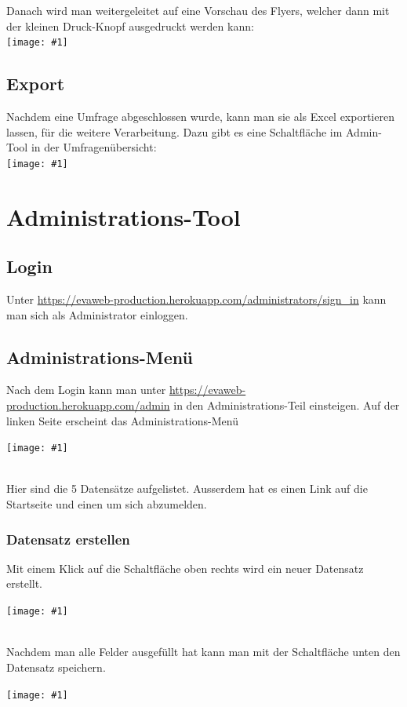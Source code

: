 \documentclass{article}
\newcommand{\inlineimage}[1]{
    \texttt{[image: \#1]}
}
\begin{document}
\begin{flushleft}
Danach wird man weitergeleitet auf eine Vorschau des Flyers, welcher dann mit der
kleinen Druck-Knopf ausgedruckt werden kann:
\\[0.25cm]
\inlineimage{images/flyer.png}
\end{flushleft}{}

\pagebreak
\subsection{Export}
Nachdem eine Umfrage abgeschlossen wurde, kann man sie als Excel exportieren lassen, für die weitere Verarbeitung.
Dazu gibt es eine Schaltfläche im Admin-Tool in der Umfragenübersicht:
\\[0.2cm]
\inlineimage{images/excel_export.png}

\pagebreak
\section{Administrations-Tool}
\subsection{Login}
Unter \underline{https://evaweb-production.herokuapp.com/administrators/sign\_in}
kann man sich als Administrator einloggen.

\subsection{Administrations-Menü}
Nach dem Login kann man unter \underline{https://evaweb-production.herokuapp.com/admin}
in den Administrations-Teil einsteigen.
Auf der linken Seite erscheint das Administrations-Menü
\newline
\inlineimage{images/adminDashboard.png}
\\[.5cm]
Hier sind die 5 Datensätze aufgelistet. Ausserdem hat es einen Link auf die Startseite und einen um sich abzumelden.

\pagebreak
\subsubsection{Datensatz erstellen}
Mit einem Klick auf die Schaltfläche oben rechts wird ein neuer Datensatz erstellt.
\newline
\inlineimage{images/adminDashboardNeu.png}
\\[1.5cm]
Nachdem man alle Felder ausgefüllt hat kann man mit der Schaltfläche unten den Datensatz speichern.
\newline
\inlineimage{images/adminDashboardNeuSpeichern.png}
\end{document}
